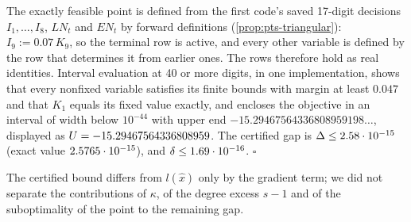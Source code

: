 The exactly feasible point is defined from the first code's saved 17-digit decisions $I_1,\dots,I_8$, $L\!N_t$ and $E\!N_t$ by forward definitions (\cref{prop:pts-triangular}):
$I_9:=0.07\,K_9$, so the terminal row is active, and every other variable is defined by the row that determines it from earlier ones.
The rows therefore hold as real identities.
Interval evaluation at 40 or more digits, in one implementation, shows that every nonfixed variable satisfies its finite bounds with margin at least $0.047$ and that $K_1$ equals its fixed value exactly,
and encloses the objective in an interval of width below $10^{-44}$ with upper end $-15.29467564336808959198\ldots$, displayed as $U=-15.29467564336808959$.
The certified gap is $\Delta\le2.58\cdot 10^{-15}$ (exact value $2.5765\cdot 10^{-15}$), and $\delta\le1.69\cdot 10^{-16}$.
\hfill$\square$

The certified bound differs from $l(\hat x)$ only by the gradient term; we did not separate the contributions of $\kappa$, of the degree excess $s-1$ and of the suboptimality of the point to the remaining gap.

\begin{certbox}
\end{certbox}

\subsubsection{}\label{app:small-pricing}

